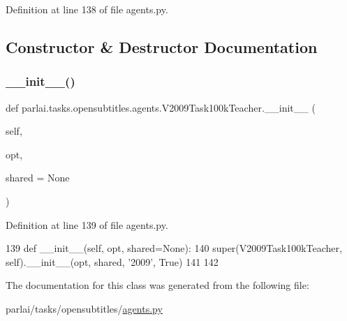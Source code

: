 Definition at line 138 of file agents.\+py.



\subsection{Constructor \& Destructor Documentation}
\mbox{\label{classparlai_1_1tasks_1_1opensubtitles_1_1agents_1_1V2009Task100kTeacher_a99fe8e12c849b677378eb7ed8c18f344}} 
\subsubsection{\texorpdfstring{\+\_\+\+\_\+init\+\_\+\+\_\+()}{\_\_init\_\_()}}
{\footnotesize\ttfamily def parlai.\+tasks.\+opensubtitles.\+agents.\+V2009\+Task100k\+Teacher.\+\_\+\+\_\+init\+\_\+\+\_\+ (\begin{DoxyParamCaption}\item[{}]{self,  }\item[{}]{opt,  }\item[{}]{shared = {\ttfamily None} }\end{DoxyParamCaption})}



Definition at line 139 of file agents.\+py.


\begin{DoxyCode}
139     \textcolor{keyword}{def }\_\_init\_\_(self, opt, shared=None):
140         super(V2009Task100kTeacher, self).\_\_init\_\_(opt, shared, \textcolor{stringliteral}{'2009'}, \textcolor{keyword}{True})
141 
142 
\end{DoxyCode}


The documentation for this class was generated from the following file\+:\begin{DoxyCompactItemize}
\item 
parlai/tasks/opensubtitles/\hyperlink{parlai_2tasks_2opensubtitles_2agents_8py}{agents.\+py}\end{DoxyCompactItemize}

